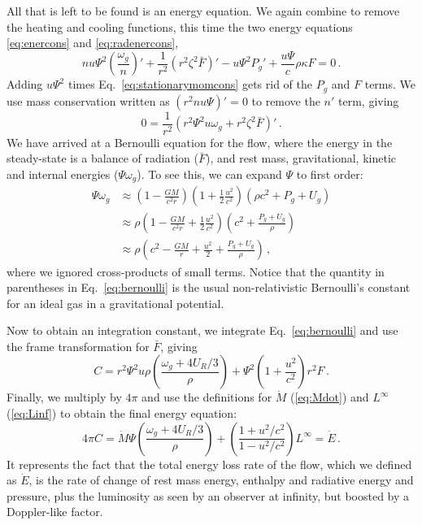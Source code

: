 \documentclass[../main.tex]{subfiles}
\begin{document}
All that is left to be found is an energy equation. We again combine to remove the heating and cooling functions, this time the two energy equations \eqref{eq:enercons} and \eqref{eq:radenercons}, 
\begin{equation}
    n u\Psi^2\left(\frac{\omega_g}{n}\right)'+\frac{1}{r^2}\left(r^2\zeta^2\bar{F}\right)'-u\Psi^2P_g'+\frac{u\Psi}{c}\rho\kappa F=0\,.
\end{equation}
Adding $u\Psi^2$ times Eq.~\eqref{eq:stationarymomcons} gets rid of the $P_g$ and $F$ terms. We use mass conservation written as $(r^2nu\Psi)'=0$ to remove the $n'$ term, giving
\begin{equation}\label{eq:bernoulli}
    0=\frac{1}{r^2}\left(r^2\Psi^2u\omega_g+r^2\zeta^2\bar{F}\right)'\,.
\end{equation}
We have arrived at a Bernoulli equation for the flow, where the energy in the steady-state is a balance of radiation ($\bar{F}$), and rest mass, gravitational, kinetic and internal energies ($\Psi\omega_g$). To see this, we can expand $\Psi$ to first order:
\begin{align}
    \Psi\omega_g &\approx \left(1-\frac{GM}{c^2 r}\right)\left(1+\frac{1}{2}\frac{u^2}{c^2}\right)(\rho c^2+P_g+U_g)\nonumber\\
    &\approx \rho\left(1-\frac{GM}{c^2r}+\frac{1}{2}\frac{u^2}{c^2}\right)\left(c^2+\frac{P_g+U_g}{\rho}\right)\nonumber\\
    &\approx \rho\left(c^2-\frac{GM}{r}+\frac{u^2}{2}+\frac{P_g+U_g}{\rho}\right)\,,\label{eq:bernoulli_approx}
\end{align}
where we ignored cross-products of small terms. Notice that the quantity in parentheses in Eq.~\eqref{eq:bernoulli} is the usual non-relativistic Bernoulli's constant for an ideal gas in a gravitational potential.

Now to obtain an integration constant, we integrate Eq.~\eqref{eq:bernoulli} and use the frame transformation for $\bar{F}$, giving
\begin{equation}
    C=r^2\Psi^2u\rho\left(\frac{\omega_g+4U_R/3}{\rho}\right)+\Psi^2\left(1+\frac{u^2}{c^2}\right)r^2F\,.
\end{equation}
Finally, we multiply by $4\pi$ and use the definitions for $\dot{M}$ (\ref{eq:Mdot}) and $L^\infty$ (\ref{eq:Linf}) to obtain the final energy equation:
\begin{equation}\label{eq:Edot}
    4\pi C=\boxed{\dot{M}\Psi\left(\frac{\omega_g+4U_R/3}{\rho}\right)+\left(\frac{1+u^2/c^2}{1-u^2/c^2}\right)L^\infty=\dot{E}} \,.
\end{equation}
It represents the fact that the total energy loss rate of the flow, which we defined as $\dot{E}$, is the rate of change of rest mass energy, enthalpy and radiative energy and pressure, plus the luminosity as seen by an observer at infinity, but boosted by a Doppler-like factor. 
\end{document}
